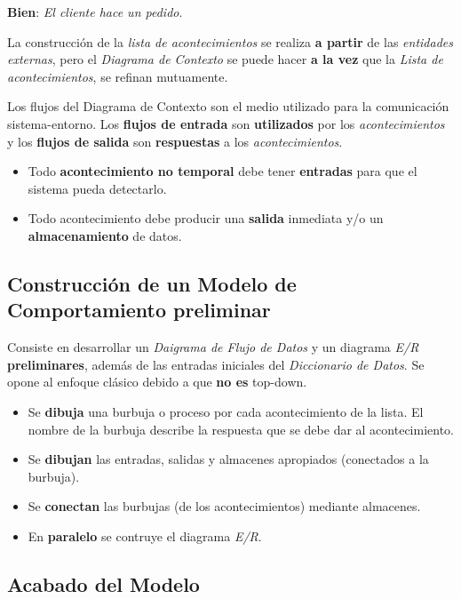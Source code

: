 \textbf{Bien}: \textit{El cliente hace un pedido}.

La construcción de la \textit{lista de acontecimientos} se realiza \textbf{a partir} de las \textit{entidades externas}, pero el \textit{Diagrama de Contexto} se puede hacer \textbf{a la vez} que la \textit{Lista de acontecimientos}, se refinan mutuamente.

Los flujos del Diagrama de Contexto son el medio utilizado para la comunicación sistema-entorno. Los \textbf{flujos de entrada} son \textbf{utilizados} por los \textit{acontecimientos} y los \textbf{flujos de salida} son \textbf{respuestas} a los \textit{acontecimientos}.

\begin{itemize}[noitemsep]
\item Todo \textbf{acontecimiento no temporal} debe tener \textbf{entradas} para que el sistema pueda detectarlo.
\item Todo acontecimiento debe producir una \textbf{salida} inmediata y/o un \textbf{almacenamiento} de datos.
\end{itemize}


\subsection{Construcción de un Modelo de Comportamiento preliminar} %

Consiste en desarrollar un \textit{Daigrama de Flujo de Datos} y un diagrama \textit{E/R} \textbf{preliminares}, además de las entradas iniciales del \textit{Diccionario de Datos}. Se opone al enfoque clásico debido a que \textbf{no es} top-down.

\begin{itemize}[noitemsep]
\item Se \textbf{dibuja} una burbuja o proceso por cada acontecimiento de la lista. El nombre de la burbuja describe la respuesta que se debe dar al acontecimiento.
\item Se \textbf{dibujan} las entradas, salidas y almacenes apropiados (conectados a la burbuja).
\item Se \textbf{conectan} las burbujas (de los acontecimientos) mediante almacenes.
\item En \textbf{paralelo} se contruye el diagrama \textit{E/R}.
\end{itemize}


\subsection{Acabado del Modelo}

